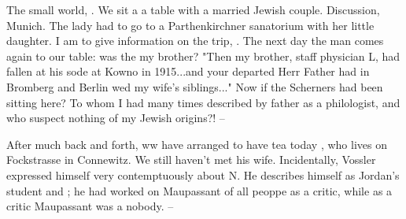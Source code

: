 
The small world, . We sit a a table with a married Jewish couple. Discussion, Munich. The lady had to go to a Parthenkirchner sanatorium with her little daughter. I am to give information on the trip, . The next day the man comes again to our table: was the  my brother? "Then my brother, staff physician L, had fallen at his sode at Kowno in 1915...and your departed Herr Father had in Bromberg and Berlin wed my wife's siblings..." Now if the Scherners had been sitting here? To whom I had many times described by father as a philologist, and who suspect nothing of my Jewish origins?! --

After much back and forth, ww have arranged to have tea today , who lives on Fockstrasse in Connewitz. We still haven't met his wife. Incidentally, Vossler expressed himself very contemptuously about N. He describes himself as Jordan's student and ; he had worked on Maupassant of all peoppe as a critic, while as a critic Maupassant was a nobody. --

\missing

